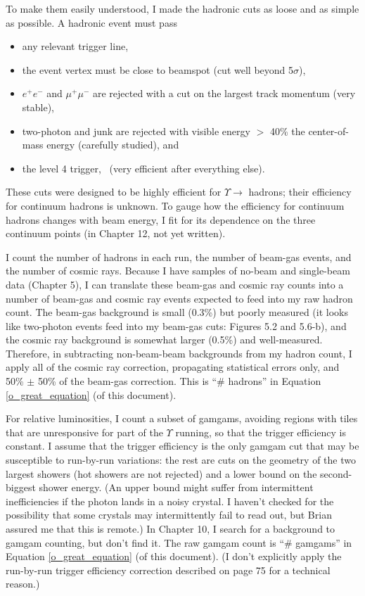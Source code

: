 \documentclass[12pt]{article}
\begin{document}
To make them easily understood, I made the hadronic cuts as loose and
as simple as possible.  A hadronic event must pass
\begin{itemize}
  \item any relevant trigger line, \label{wonderfulcuts}
  \item the event vertex must be close to beamspot (cut well beyond
    5$\sigma$),
  \item $e^+e^-$ and $\mu^+\mu^-$ are rejected with a cut on the
    largest track momentum (very stable),
  \item two-photon and junk are rejected with visible energy $>$ 40\%
    the center-of-mass energy (carefully studied), and
  \item the level 4 trigger, \lfourdec\ (very efficient after
    everything else).
\end{itemize}
These cuts were designed to be highly efficient for $\Upsilon \to$
hadrons; their efficiency for continuum hadrons is unknown.  To gauge
how the efficiency for continuum hadrons changes with beam energy, I
fit for its dependence on the three continuum points (in Chapter 12,
not yet written).

I count the number of hadrons in each run, the number of beam-gas
events, and the number of cosmic rays.  Because I have samples of
no-beam and single-beam data (Chapter 5), I can translate these
beam-gas and cosmic ray counts into a number of beam-gas and cosmic
ray events expected to feed into my raw hadron count.  The beam-gas
background is small (0.3\%) but poorly measured (it looks like
two-photon events feed into my beam-gas cuts: Figures 5.2 and 5.6-b),
and the cosmic ray background is somewhat larger (0.5\%) and
well-measured.  Therefore, in subtracting non-beam-beam backgrounds
from my hadron count, I apply all of the cosmic ray correction,
propagating statistical errors only, and 50\% $\pm$ 50\% of the
beam-gas correction.  This is ``\# hadrons'' in Equation
\ref{o_great_equation} (of this document).

For relative luminosities, I count a subset of gamgams, avoiding
regions with tiles that are unresponsive for part of the $\Upsilon$
running, so that the trigger efficiency is constant.  I assume that
the trigger efficiency is the only gamgam cut that may be susceptible
to run-by-run variations: the rest are cuts on the geometry of the two
largest showers (hot showers are not rejected) and a lower bound on
the second-biggest shower energy.  (An upper bound might suffer from
intermittent inefficiencies if the photon lands in a noisy crystal.  I
haven't checked for the possibility that some crystals may
intermittently fail to read out, but Brian assured me that this is
remote.)  In Chapter 10, I search for a background to gamgam counting,
but don't find it.  The raw gamgam count is ``\# gamgams'' in Equation
\ref{o_great_equation} (of this document).  (I don't explicitly apply
the run-by-run trigger efficiency correction described on page 75 for
a technical reason.)
\end{document}
